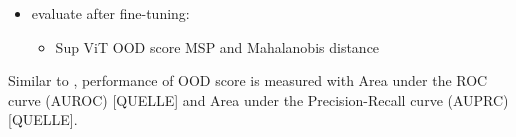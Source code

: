 \begin{itemize}
\begin{itemize}
		\item evaluate after fine-tuning: 
		\begin{itemize}
			\item Sup ViT OOD score MSP and Mahalanobis distance
		\end{itemize}
	\end{itemize}
	Similar to \citep{Berger2021, Cao2020}, performance of OOD score is measured with Area under the ROC curve (AUROC) [QUELLE] and Area under the Precision-Recall curve (AUPRC) [QUELLE].
\end{itemize}


